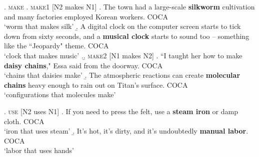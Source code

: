 \ex. \textsc{make}
\a. \textsc{make1} [N2 makes N1]
\a. \label{ex:silk_worm}%
The town had a large-scale \textbf{silkworm} cultivation and many factories employed
Korean workers. COCA
\\`worm that makes silk'
\b. \label{ex:musical_clock }%
A digital clock on the computer screen starts to tick down
from sixty seconds, and a \textbf{musical clock} starts to sound too -- something like
the ``Jeopardy" theme. COCA
\\`clock that makes music'
\z.\pagebreak[4]
\b. \textsc{make2} [N1 makes N2]
\a. \label{ex:daisy_chains}%
 ``I taught her how to make \textbf{daisy chains}," Essa said from the doorway. COCA
\\
`chains that daisies make'
\b. \label{ex:molecular_chains}
The atmospheric reactions can create \textbf{molecular chains} heavy
enough to rain out on Titan's surface. COCA
\\ `configurations that molecules make'

\ex. \textsc{use} [N2 uses N1]
\a. \label{ex:steam_iron}%
If you need to press the felt, use a \textbf{steam iron} or damp cloth. COCA
\\`iron that uses steam'
\b. \label{ex:manual_labor}
It's hot, it's dirty, and it's undoubtedly \textbf{manual labor}. COCA
\\`labor that uses hands'


